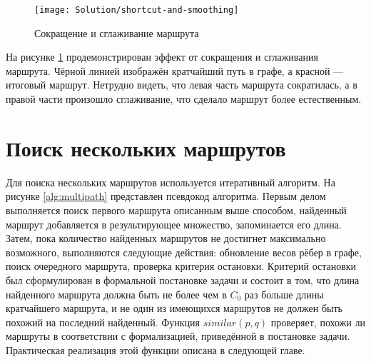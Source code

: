 \begin{figure}
    \texttt{[image: Solution/shortcut-and-smoothing]}
    \caption{Сокращение и сглаживание маршрута}
    \label{fig:path-improvements}
\end{figure}

На рисунке \ref{fig:path-improvements} продемонстрирован эффект от
сокращения и сглаживания маршрута. Чёрной линией изображён кратчайший
путь в графе, а красной --- итоговый маршрут. Нетрудно видеть, что
левая часть маршрута сократилась, а в правой части произошло
сглаживание, что сделало маршрут более естественным.

\FloatBarrier

\section{Поиск нескольких маршрутов}

\label{sec:multi-search}

Для поиска нескольких маршрутов используется итеративный алгоритм. На
рисунке \ref{alg:multipath} представлен псевдокод алгоритма. Первым
делом выполняется поиск первого маршрута описанным выше способом,
найденный маршрут добавляется в результирующее множество, запоминается
его длина. Затем, пока количество найденных маршрутов не достигнет
максимально возможного, выполняются следующие действия: обновление
весов рёбер в графе, поиск очередного маршрута, проверка критерия
остановки. Критерий остановки был сформулирован в формальной
постановке задачи и состоит в том, что длина найденного маршрута
должна быть не более чем в $C_0$ раз больше длины кратчайшего
маршрута, и не один из имеющихся маршрутов не должен быть похожий на
последний найденный. Функция $similar(p, q)$ проверяет, похожи ли
маршруты в соответствии с формализацией, приведённой в постановке
задачи. Практическая реализация этой функции описана в следующей
главе.

